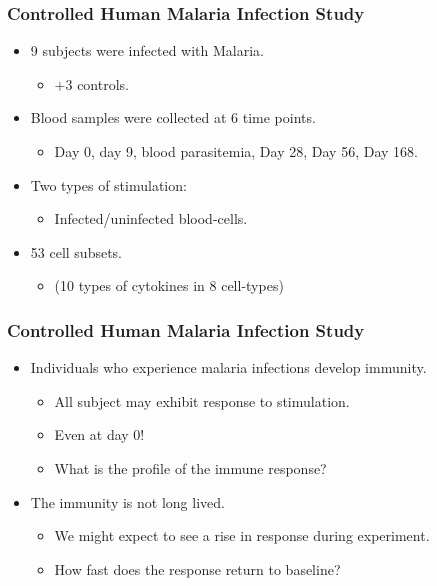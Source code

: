 \documentclass{beamer}
\theoremstyle{definition}
\begin{document}

\begin{frame}
\frametitle{Controlled Human Malaria Infection Study}
\begin{itemize}
\item 9 subjects were infected with Malaria.
	\begin{itemize}
	\item +3 controls.
	\end{itemize}
	\vspace{0.75 cm}
	
\item Blood samples were collected at 6 time points.
	\begin{itemize}
	\item Day 0, day 9, blood  parasitemia, Day 28, Day 56, Day 168.
	\end{itemize}
	\vspace{0.75 cm}

\item Two types of stimulation:
	\begin{itemize}
	\item Infected/uninfected blood-cells.
	\end{itemize}
	\vspace{0.75 cm}
	
\item 53 cell subsets.
	\begin{itemize}
	\item (10 types of cytokines in 8 cell-types)
	\end{itemize} 
\end{itemize}
\end{frame}


\begin{frame}
\frametitle{Controlled Human Malaria Infection Study}
\begin{itemize}
\item  Individuals  who  experience malaria  infections develop  immunity.
	\begin{itemize}
	\item All subject may exhibit response to stimulation.
	\item Even at day 0!
	\item What is the profile of the immune response?
	\end{itemize}
	
\pause
\vspace{0.5 cm}
\item The  immunity is not long lived.
	\begin{itemize}
	\item We might expect to see a rise in response during experiment.
	\item How fast does the response return to baseline?
	\end{itemize}
\end{itemize}
\end{frame}
\end{document}
